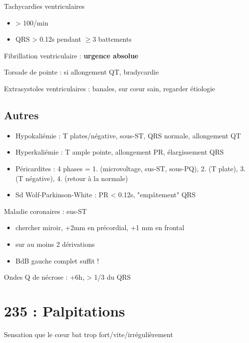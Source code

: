 \documentclass{article}
\begin{document}
Tachycardies ventriculaires
\begin{itemize}
  \item > 100/min
  \item QRS > 0.12s pendant $\ge 3$ battements
\end{itemize}
Fibrillation ventriculaire : \textbf{urgence absolue}  \skull

Torsade de pointe : si allongement QT, bradycardie

Extrasystoles ventriculaires : banales, sur c\oe{}ur sain, regarder étiologie

\subsection{Autres}
\begin{itemize}
  \item Hypokaliémie : T plates/négative, sous-ST, QRS normale, allongement QT
  \item Hyperkaliémie : T ample pointe, allongement PR, élargissement QRS
  \item Péricardites : 4 phases = 1. (microvoltage, sus-ST, sous-PQ), 2. (T plate), 3. (T
    négative), 4. (retour à la normale)
  \item Sd Wolf-Parkinson-White : PR < 0.12s, "empâtement" QRS
\end{itemize}

Maladie coronaires : sus-ST
\begin{itemize}
  \item chercher miroir, +2mm en précordial, +1 mm en frontal
  \item sur au moins 2 dérivations
  \item BdB gauche complet suffit !
\end{itemize}
Ondes Q de nécrose : +6h, > 1/3 du QRS

\section{235 : Palpitations}%
\label{sec:235_palpitations}
Sensation que le c\oe{}ur bat trop fort/vite/irrégulièrement
\end{document}
